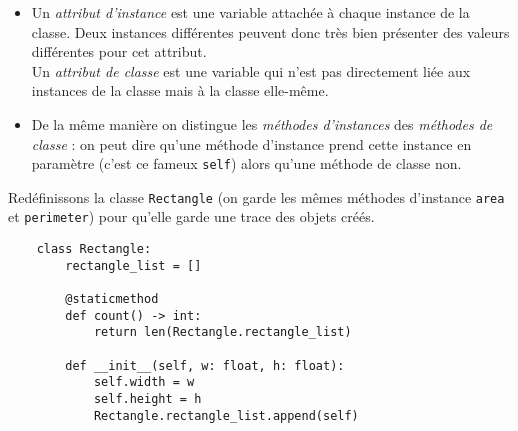\documentclass[a4paper,10pt,cours,firamath]{nsi}
\begin{document}
\begin{definition}[s]
    \begin{itemize}
        \item     Un \textit{attribut d'instance} est une variable attachée à chaque instance de la classe. Deux instances différentes peuvent donc très bien présenter des valeurs différentes pour cet attribut.\\
              Un \textit{attribut de classe} est une variable qui n'est pas directement liée aux instances de la classe mais à la classe elle-même.
        \item     De la même manière on distingue les \textit{méthodes d'instances} des \textit{ méthodes de classe} : on peut dire qu'une méthode d'instance prend cette instance en paramètre (c'est ce fameux \texttt{self}) alors qu'une méthode de classe non.
    \end{itemize}
\end{definition}

Redéfinissons la classe \texttt{Rectangle} (on garde les mêmes méthodes d'instance \texttt{area} et \texttt{perimeter}) pour qu'elle garde une trace des objets créés.

\begin{pyc}
    \begin{verbatim}
    class Rectangle:
        rectangle_list = []
    
        @staticmethod
        def count() -> int:
            return len(Rectangle.rectangle_list)
        
        def __init__(self, w: float, h: float):
            self.width = w
            self.height = h
            Rectangle.rectangle_list.append(self)
        \end{verbatim}
\end{pyc}
\end{document}
